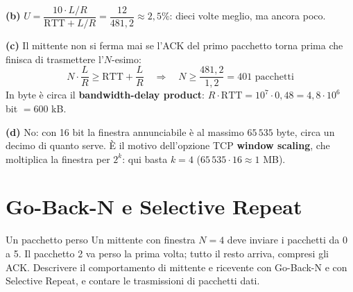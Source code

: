 \textbf{(b)} $U = \dfrac{10 \cdot L/R}{\text{RTT} + L/R} = \dfrac{12}{481{,}2} \approx 2{,}5\%$: dieci volte meglio, ma ancora poco.

\textbf{(c)} Il mittente non si ferma mai se l'ACK del primo pacchetto torna prima che finisca di trasmettere l'$N$-esimo:
$$N \cdot \frac{L}{R} \ge \text{RTT} + \frac{L}{R} \quad\Rightarrow\quad N \ge \frac{481{,}2}{1{,}2} = 401 \text{ pacchetti}$$
In byte è circa il \textbf{bandwidth-delay product}: $R \cdot \text{RTT} = 10^7 \cdot 0{,}48 = 4{,}8\cdot 10^6$ bit $= 600$ kB.

\textbf{(d)} No: con 16 bit la finestra annunciabile è al massimo $65\,535$ byte, circa un decimo di quanto serve. È il motivo
dell'opzione TCP \textbf{window scaling}, che moltiplica la finestra per $2^k$: qui basta $k = 4$ ($65\,535 \cdot 16 \approx
1$ MB).


\section{Go-Back-N e Selective Repeat}

\begin{esercizio}{Un pacchetto perso}
Un mittente con finestra $N = 4$ deve inviare i pacchetti da 0 a 5. Il pacchetto 2 va perso la prima volta; tutto il resto
arriva, compresi gli ACK. Descrivere il comportamento di mittente e ricevente con Go-Back-N e con Selective Repeat, e contare
le trasmissioni di pacchetti dati.
\end{esercizio}

